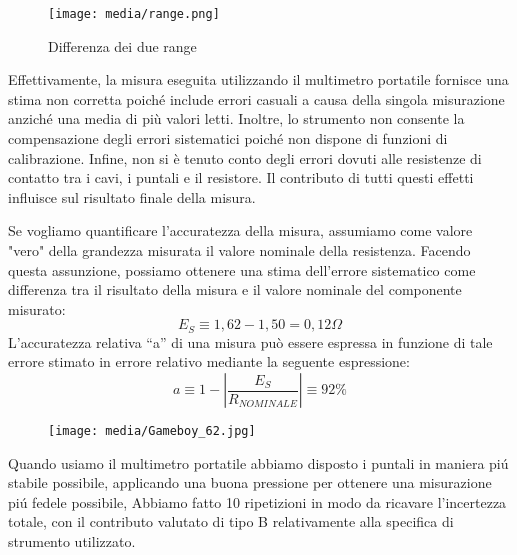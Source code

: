 \begin{figure}[h]
    \centering
    \texttt{[image: media/range.png]}
    \caption{Differenza dei due range}
    \label{fig:range}
\end{figure}

Effettivamente, la misura eseguita utilizzando il multimetro portatile fornisce una stima non corretta poiché include errori casuali a causa della singola misurazione anziché una media di più valori letti. Inoltre, lo strumento non consente la compensazione degli errori sistematici poiché non dispone di funzioni di calibrazione. Infine, non si è tenuto conto degli errori dovuti alle resistenze di contatto tra i cavi, i puntali e il resistore. Il contributo di tutti questi effetti influisce sul risultato finale della misura.

Se vogliamo quantificare l'accuratezza della misura, assumiamo come valore "vero" della grandezza misurata il valore nominale della resistenza. Facendo questa assunzione, possiamo ottenere una stima dell'errore sistematico come differenza tra il risultato della misura e il valore nominale del componente misurato:
\begin{equation}
    E_S \equiv 1,62 - 1,50 = 0,12\Omega
\end{equation}
L’accuratezza relativa “a” di una misura può essere espressa in funzione di tale errore 
stimato in errore relativo mediante la seguente espressione: 
\begin{equation}
    a \equiv 1 - \left| \frac{E_S}{R_{NOMINALE}}\right| \equiv 92\%
\end{equation}

\newline \newline
{}   \newline

\begin{figure}[h]
    \centering
    \texttt{[image: media/Gameboy\_62.jpg]}
    \label{fig:mult_port_nostro}
\end{figure}

Quando usiamo il multimetro portatile abbiamo disposto i puntali in maniera pi\'u stabile possibile, applicando una buona pressione per ottenere una misurazione pi\'u fedele possibile,
Abbiamo fatto 10 ripetizioni in modo da ricavare l'incertezza totale, con il contributo valutato di tipo B relativamente alla specifica di strumento utilizzato.


